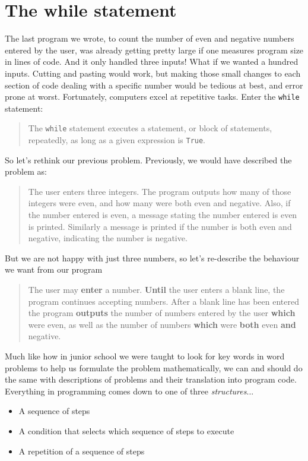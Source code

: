 \section{The while statement}

The last program we wrote, to count the number of even and negative   numbers entered by the user, was already getting pretty large if one   measures program size in lines of code. And it only handled three   inputs! What if we wanted a hundred inputs.  Cutting and pasting would   work, but making those small changes to each section of code dealing   with a specific number would be tedious at best, and error prone at   worst. Fortunately, computers excel at repetitive tasks.     Enter the \texttt{while} statement:

\begin{quotation}The \texttt{while} statement executes a statement, or block of statements,   repeatedly, as long as a given expression is \texttt{True}. \end{quotation}

So let's rethink our   previous problem. Previously, we would have described the problem as:
\begin{quotation}     The user enters three integers. The program outputs how many of    those integers were even, and how many were both even and negative.    Also, if the number entered is even, a message stating the number    entered is even is printed. Similarly a message is printed if the    number is both even and negative, indicating the number is    negative.    
\end{quotation}

But we are not happy with just three numbers, so let's re-describe   the behaviour we want from our program
\begin{quotation}     The user may \textbf{enter} a number.    \textbf{Until} the user enters a blank line, the program    continues accepting numbers. After a blank line has been entered    the program \textbf{outputs} the number of numbers entered    by the user \textbf{which} were even, as well as the number    of numbers \textbf{which} were \textbf{both} even \textbf{and}    negative.    
\end{quotation}

Much like how in junior school we were taught to look for key words   in word problems to help us formulate the problem mathematically, we   can and should do the same with descriptions of problems and their   translation into program code. Everything in programming comes down to   one of three \textit{structures}...
\begin{itemize}
	\item A sequence of steps
	\item A condition that selects which sequence of steps to    execute
	\item A repetition of a sequence of steps
\end{itemize}

